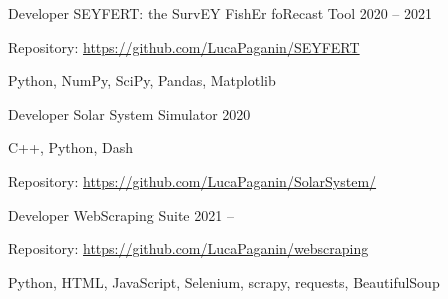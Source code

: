 

\begin{cventries}


\cventry
{Developer} %
{SEYFERT: the SurvEY FishEr foRecast Tool} %
{} %
{2020 -- 2021} %
{ %
\begin{cvitems}
  \item {}
  \item {}
  \item {Repository: \url{https://github.com/LucaPaganin/SEYFERT}}
  \item {Python, NumPy, SciPy, Pandas, Matplotlib}
\end{cvitems}
}


\cventry
{Developer} %
{Solar System Simulator} %
{} %
{2020} %
{ %
\begin{cvitems}
    \item {}
    \item {}
    \item {}
    \item {C++, Python, Dash}
    \item {Repository: \url{https://github.com/LucaPaganin/SolarSystem/}}  
\end{cvitems}
}


\cventry
{Developer} %
{WebScraping Suite} %
{} %
{2021 -- } %
{ %
\begin{cvitems}
  \item {}
  \item {}
  \item {Repository: \url{https://github.com/LucaPaganin/webscraping}}
  \item {Python, HTML, JavaScript, Selenium, scrapy, requests, BeautifulSoup}
\end{cvitems}
}


\end{cventries}
